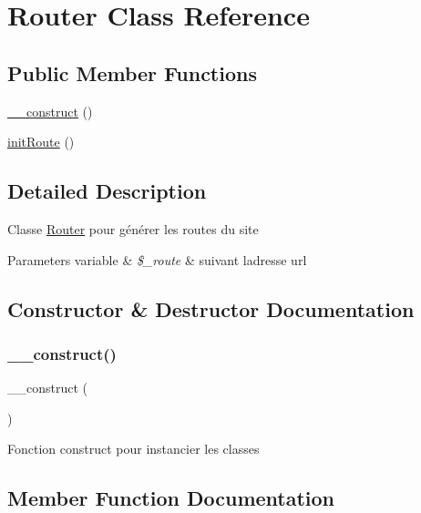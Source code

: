 \hypertarget{class_app_1_1_router}{}\section{Router Class Reference}
\label{class_app_1_1_router}
\subsection*{Public Member Functions}
\begin{DoxyCompactItemize}
\item 
\hyperlink{class_app_1_1_router_a095c5d389db211932136b53f25f39685}{\+\_\+\+\_\+construct} ()
\item 
\hyperlink{class_app_1_1_router_a6fa8800727e8e7eeab56d569bfa3429b}{init\+Route} ()
\end{DoxyCompactItemize}


\subsection{Detailed Description}
Classe \hyperlink{class_app_1_1_router}{Router} pour générer les routes du site 
\begin{DoxyParams}[1]{Parameters}
variable & {\em \$\+\_\+route} & suivant l\textquotesingle{}adresse url \\
\hline
\end{DoxyParams}


\subsection{Constructor \& Destructor Documentation}
\mbox{\label{class_app_1_1_router_a095c5d389db211932136b53f25f39685}} 
\subsubsection{\texorpdfstring{\+\_\+\+\_\+construct()}{\_\_construct()}}
{\footnotesize\ttfamily \+\_\+\+\_\+construct (\begin{DoxyParamCaption}{ }\end{DoxyParamCaption})}

Fonction construct pour instancier les classes 

\subsection{Member Function Documentation}
\mbox{\label{class_app_1_1_router_a6fa8800727e8e7eeab56d569bfa3429b}} 
